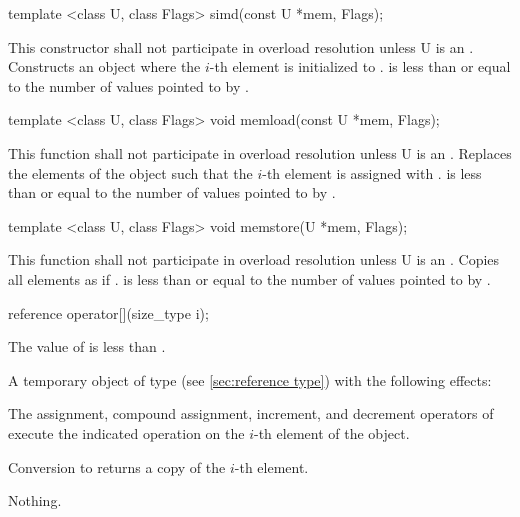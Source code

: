 \begin{itemdecl}
template <class U, class Flags> simd(const U *mem, Flags);
\end{itemdecl}
\begin{itemdescr}
  \pnum\remarks This constructor shall not participate in overload resolution unless \type U is an \realArithmeticType.
  \pnum\effects Constructs an object where the $i$-th element is initialized to  \foralli.
  \pnum\requires {} is less than or equal to the number of values pointed to by .
\end{itemdescr}

\begin{itemdecl}
template <class U, class Flags> void memload(const U *mem, Flags);
\end{itemdecl}
\begin{itemdescr}
  \pnum\remarks This function shall not participate in overload resolution unless \type U is an \realArithmeticType.
  \pnum\effects Replaces the elements of the \simd object such that the $i$-th element is assigned with  \foralli.
  \pnum\requires {} is less than or equal to the number of values pointed to by .
\end{itemdescr}

\begin{itemdecl}
template <class U, class Flags> void memstore(U *mem, Flags);
\end{itemdecl}
\begin{itemdescr}
  \pnum\remarks This function shall not participate in overload resolution unless \type U is an \realArithmeticType.
  \pnum\effects Copies all \simd elements as if  \foralli.
  \pnum\requires {} is less than or equal to the number of values pointed to by .
\end{itemdescr}

\newcommand\simdElementReference[1]{
  \pnum\requires The value of \code{i} is less than \code{size()}.

  \pnum\returns A temporary object of type \referencetype (see \ref{sec:reference type}) with the following effects:

  \pnum\effects The assignment, compound assignment, increment, and decrement operators of \referencetype execute the indicated operation on the $i$-th element of the #1 object.

  \pnum\effects Conversion to \valuetype returns a copy of the $i$-th element.

  \pnum\throws Nothing.
}
\begin{itemdecl}
reference operator[](size_type i);
\end{itemdecl}
\begin{itemdescr}
  \simdElementReference{\simd{}}
\end{itemdescr}

